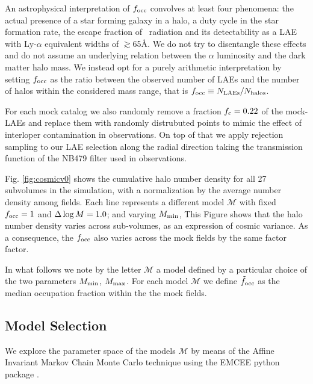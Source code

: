 \documentclass{emulateapj}
\newcommand{\ly}{{\ifmmode{{\rm Ly}\alpha}\else{Ly$\alpha$}\fi}}
\newcommand{\mmin}{{\ifmmode{{M_{\rm min}}}\else{${M_{\rm min}}$}\fi}}
\newcommand{\dlm}{{\ifmmode{{\Delta \log M}}\else{$\Delta \log M$}\fi}}
\newcommand{\focc}{{\ifmmode{{f_{\rm occ}}}\else{${f_{\rm occ}}$}\fi}}
\begin{document}
An astrophysical interpretation of $f_{\rm occ}$ convolves at least
four phenomena: the actual presence of a star forming galaxy in a
halo, a duty cycle in the star formation rate, the escape fraction of
\ly\ radiation and its detectability as a LAE with Ly-$\alpha$ equivalent widths of $\gtrsim$65\AA.   
We do not try to disentangle these effects and do not assume an underlying relation between the
$\alpha$ luminosity and the dark matter halo mass.
We instead opt for a purely arithmetic interpretation by setting
$\focc$ as the ratio between the observed number of LAEs and the
number of halos within the considered mass range, that is $\focc \equiv N_{\rm
  LAEs}/N_{\mathrm{halos}}$.   

For each mock catalog we also randomly remove a fraction $f_{\rm c}=0.22$  of the mock-LAEs and replace 
them with randomly distrubuted points to mimic the effect of interloper
contamination   in \citet{Bielby16} observations. 
On top of that we apply rejection sampling  to our LAE selection 
along the radial direction taking the transmission function of the
NB479 filter used in \citet{Bielby16} observations. 



Fig. \ref{fig:cosmicv0}  shows the cumulative halo number density
for all 27 subvolumes in the simulation, with a normalization by the
average number density among fields. 
Each line represents a different model $\mathcal{M}$ with fixed
$\focc=1$ and $\dlm=1.0$; and varying $\mmin$, 
This Figure shows that the halo number density varies across
sub-volumes, as an expression of cosmic variance. 
As a consequence, the $\focc$ also varies across the mock fields  
by the same factor factor. 



In what follows we note by the letter ${\mathcal M}$ a model
defined by a particular choice of the two parameters $M_{\rm min}$, 
$M_{\rm  max}$. For each model  ${\mathcal M}$ we define
$\tilde{f}_{\rm occ}$ as the median occupation fraction within the the
mock fields.

\subsection{Model Selection}
\label{subsec:explore}



We  explore the parameter space of the models
${\mathcal M}$ by  means of the Affine Invariant  Markov Chain Monte Carlo technique using
the EMCEE python package \citep[][and references therein]{emcee2013}. 
\end{document}
